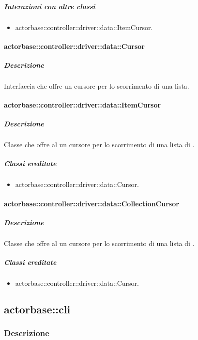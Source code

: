 \documentclass{scalatekids-article}
\begin{document}
\subparagraph{Interazioni con altre classi}

\begin{itemize}
\item actorbase::controller::driver::data::ItemCursor.
\end{itemize}

\paragraph{actorbase::controller::driver::data::Cursor}

\subparagraph{Descrizione}

Interfaccia che offre un cursore per lo scorrimento di una lista.

\paragraph{actorbase::controller::driver::data::ItemCursor}

\subparagraph{Descrizione}

Classe che offre al  un cursore per lo scorrimento di una lista di .

\subparagraph{Classi ereditate}

\begin{itemize}
\item actorbase::controller::driver::data::Cursor.
\end{itemize}

\paragraph{actorbase::controller::driver::data::CollectionCursor}

\subparagraph{Descrizione}

Classe che offre al  un cursore per lo scorrimento di una lista di .

\subparagraph{Classi ereditate}

\begin{itemize}
\item actorbase::controller::driver::data::Cursor.
\end{itemize}

\subsection{actorbase::cli}

\subsubsection{Descrizione}
\end{document}
